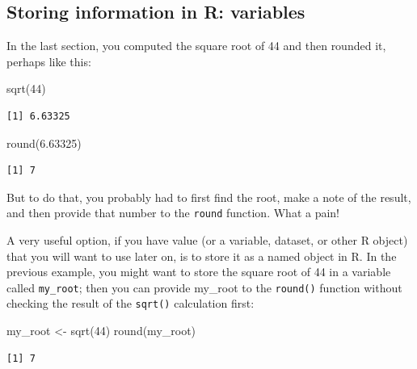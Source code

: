 \documentclass[
  letterpaper,
  DIV=11,
  numbers=noendperiod]{scrreprt}
\newenvironment{Shaded}{\begin{snugshade}}{\end{snugshade}}
\newcommand{\DecValTok}[1]{\textcolor[rgb]{0.68,0.00,0.00}{#1}}
\newcommand{\FloatTok}[1]{\textcolor[rgb]{0.68,0.00,0.00}{#1}}
\newcommand{\FunctionTok}[1]{\textcolor[rgb]{0.28,0.35,0.67}{#1}}
\newcommand{\NormalTok}[1]{\textcolor[rgb]{0.00,0.23,0.31}{#1}}
\newcommand{\OtherTok}[1]{\textcolor[rgb]{0.00,0.23,0.31}{#1}}
\theoremstyle{remark}
\begin{document}
\subsection{Storing information in R:
variables}\label{storing-information-in-r-variables}

In the last section, you computed the square root of 44 and then rounded
it, perhaps like this:

\begin{Shaded}
\begin{Highlighting}[]
\FunctionTok{sqrt}\NormalTok{(}\DecValTok{44}\NormalTok{)}
\end{Highlighting}
\end{Shaded}

\begin{verbatim}
[1] 6.63325
\end{verbatim}

\begin{Shaded}
\begin{Highlighting}[]
\FunctionTok{round}\NormalTok{(}\FloatTok{6.63325}\NormalTok{)}
\end{Highlighting}
\end{Shaded}

\begin{verbatim}
[1] 7
\end{verbatim}

But to do that, you probably had to first find the root, make a note of
the result, and then provide that number to the \texttt{round} function.
What a pain!

A very useful option, if you have value (or a variable, dataset, or
other R object) that you will want to use later on, is to store it as a
named object in R. In the previous example, you might want to store the
square root of 44 in a variable called \texttt{my\_root}; then you can
provide my\_root to the \texttt{round()} function without checking the
result of the \texttt{sqrt()} calculation first:

\begin{Shaded}
\begin{Highlighting}[]
\NormalTok{my\_root }\OtherTok{\textless{}{-}} \FunctionTok{sqrt}\NormalTok{(}\DecValTok{44}\NormalTok{)}
\FunctionTok{round}\NormalTok{(my\_root)}
\end{Highlighting}
\end{Shaded}

\begin{verbatim}
[1] 7
\end{verbatim}
\end{document}
